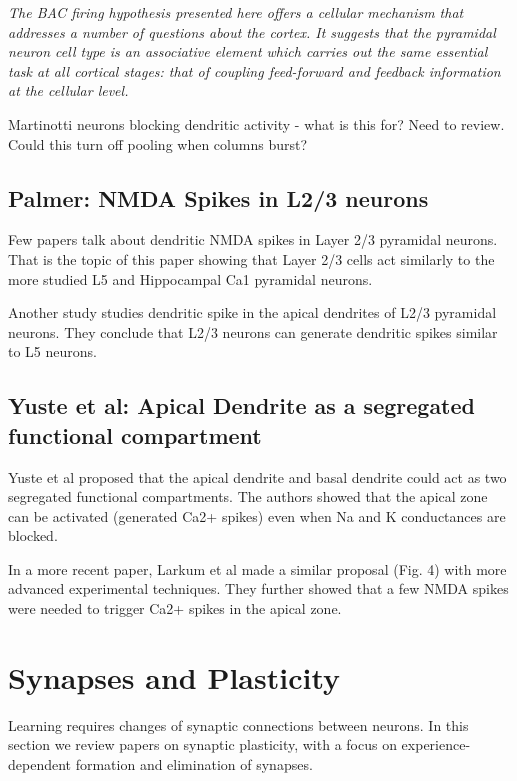 \documentclass{article} %
\begin{document}
\emph{The BAC firing hypothesis presented here offers a cellular mechanism that
addresses a number of questions about the cortex. It suggests that the
pyramidal neuron cell type is an associative element which carries out the same
essential task at all cortical stages: that of coupling feed-forward and
feedback information at the cellular level.}


Martinotti neurons blocking dendritic activity - what is this for? Need to
review. Could this turn off pooling when columns burst?


\subsection{Palmer: NMDA Spikes in L2/3 neurons}

Few papers talk about dendritic NMDA spikes in Layer 2/3 pyramidal neurons.
That is the topic of this paper \cite{Palmer2014} showing that Layer 2/3 cells
act similarly to the more studied L5 and Hippocampal Ca1 pyramidal neurons.

Another study \cite{Larkum2007} studies dendritic spike in the apical dendrites of L2/3 pyramidal neurons. They conclude that L2/3 neurons can generate dendritic spikes similar to L5 neurons.

\subsection{Yuste et al: Apical Dendrite as a segregated functional compartment}

Yuste et al \cite{Yuste1994} proposed that the apical dendrite and basal dendrite could act as two segregated functional compartments. The authors showed that the apical zone can be activated (generated Ca2+ spikes) even when Na and K conductances are blocked. 

In a more recent paper, Larkum et al \cite{Larkum2009} made a similar proposal (Fig. 4) with more advanced experimental techniques. They further showed that a few NMDA spikes were needed to trigger Ca2+ spikes in the apical zone.


\section{Synapses and Plasticity}

Learning requires changes of synaptic connections between neurons. In this
section we review papers on synaptic plasticity, with a focus on
experience-dependent formation and elimination of synapses.
\end{document}
